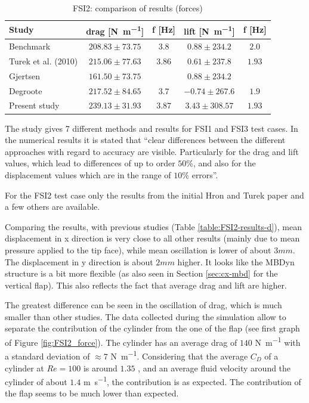 \begin{table}[!htb]
	\begin{center}
		\begin{tabular}{ l | c c | c c  |  } 
			Study & drag [\si{N.m^{-1}}] & f [\si{Hz}] & lift [\si{N.m^{-1}}] & f [\si{Hz}]    \\ 
			\hline
			\hline
			Benchmark  \cite{turek2006proposal} & $208.83\pm73.75$ & $3.8$ & $0.88\pm234.2$ & $2.0$     \\
			Turek et al. (2010) \cite{turek2010numerical} & $215.06\pm77.63$ & $3.86$ & $0.61\pm237.8$ & $1.93$\\   
			Gjertsen \cite{gjertsen2017development} & $161.50\pm73.75$ & & $0.88\pm234.2$ & \\
			Degroote \cite{degroote2009interface}  & $217.52\pm84.65$ & $3.7$ & $-0.74\pm267.6$ & $1.9$ \\
			\hline
			Present study & $239.13\pm31.93$ & $3.87$ & $3.43\pm308.57$ & $1.93$ \\
		\end{tabular}
	\end{center}
	\caption{FSI2: comparison of results (forces)}
	\label{table:FSI2-results-f}
\end{table}


The study \cite{turek2010numerical} gives 7 different methods and results for FSI1 and FSI3 test cases. In the numerical results it is stated that ``clear differences between the different approaches with regard to accuracy are visible. Particularly for the drag and lift values, which lead to differences of up to order $50\%$, and also for the displacement values which are in the range of $10\%$ errors''.

For the FSI2 test case only the results from the initial Hron and Turek paper \cite{turek2006proposal} and a few others are available.

Comparing the results, with previous studies (Table \ref{table:FSI2-results-d}), mean displacement in x direction is very close to all other results (mainly due to mean pressure applied to the tip face), while mean oscillation is lower of about $3mm$. The displacement in y direction is about $2mm$ higher. It looks like the MBDyn structure is a bit more flexible (as also seen in Section \ref{sec:cx-mbd} for the vertical flap). This also reflects the fact that average drag and lift are higher.

The greatest difference can be seen in the oscillation of drag, which is much smaller than other studies. The data collected during the simulation allow to separate the contribution of the cylinder from the one of the flap (see first graph of Figure \ref{fig:FSI2_force}). The cylinder has an average drag of $140$ \si{N.m^{-1}} with a standard deviation of $\approx7$ \si{N.m^{-1}}. Considering that the average $C_D$ of a cylinder at $Re=100$ is around $1.35$ \cite{qin2017direct}, and an average fluid velocity around the cylinder of about $1.4$ \si{m.s^{-1}}, the contribution is as expected. The contribution of the flap seems to be much lower than expected.

